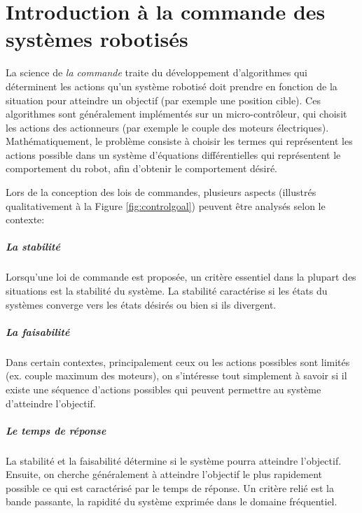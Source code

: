 \chapter{Introduction à la commande des systèmes robotisés}
\label{sec:introcommanderobots}

La science de \textit{la commande }traite du développement d'algorithmes qui déterminent les actions qu'un système robotisé doit prendre en fonction de la situation pour atteindre un objectif (par exemple une position cible). Ces algorithmes sont généralement implémentés sur un micro-contrôleur, qui choisit les actions des actionneurs (par exemple le couple des moteurs électriques). Mathématiquement, le problème consiste à choisir les termes qui représentent les actions possible dans un système d'équations différentielles qui représentent le comportement du robot, afin d'obtenir le comportement désiré.

Lors de la conception des lois de commandes, plusieurs aspects (illustrés qualitativement à la Figure \ref{fig:controlgoal}) peuvent être analysés selon le contexte: 

\paragraph{La stabilité} 

Lorsqu'une loi de commande est proposée, un critère essentiel dans la plupart des situations est la stabilité du système. La stabilité caractérise si les états du systèmes converge vers les états désirés ou bien si ils divergent. 

\paragraph{La faisabilité} 

Dans certain contextes, principalement ceux ou les actions possibles sont limités (ex. couple maximum des moteurs), on s'intéresse tout simplement à savoir si il existe une séquence d'actions possibles qui peuvent permettre au système d'atteindre l'objectif. 

\paragraph{Le temps de réponse} 

La stabilité et la faisabilité détermine si le système pourra atteindre l'objectif. Ensuite, on cherche généralement à atteindre l'objectif le plus rapidement possible ce qui est caractérisé par le temps de réponse. Un critère relié est la bande passante, la rapidité du système exprimée dans le domaine fréquentiel.

